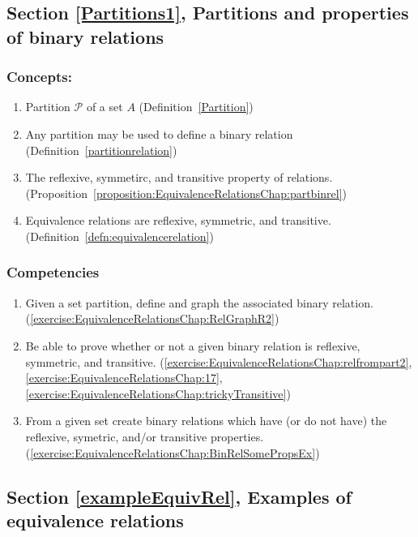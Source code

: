 \subsection*{Section \ref{Partitions1}, Partitions and properties of binary relations}
\subsubsection*{Concepts:}
\begin{enumerate}
\item 
Partition $\mathcal{P}$ of a set $A$ (Definition~\ref{Partition})
\item 
Any partition may be used to define a binary relation (Definition~\ref{partitionrelation})
\item 
The reflexive, symmetirc, and transitive property of relations. (Proposition~\ref{proposition:EquivalenceRelationsChap:partbinrel})
\item 
Equivalence relations are reflexive, symmetric, and transitive. (Definition~\ref{defn:equivalencerelation})
\end{enumerate}

\subsubsection*{Competencies}
\begin{enumerate}
\item
Given a set partition, define and graph the associated binary relation. (\ref{exercise:EquivalenceRelationsChap:RelGraphR2})
\item
Be able to prove whether or not a given binary relation is reflexive, symmetric, and transitive. (\ref{exercise:EquivalenceRelationsChap:relfrompart2}, \ref{exercise:EquivalenceRelationsChap:17}, \ref{exercise:EquivalenceRelationsChap:trickyTransitive})
\item
From a given set create binary relations which have (or do not have) the reflexive, symetric, and/or transitive properties. (\ref{exercise:EquivalenceRelationsChap:BinRelSomePropsEx})
\end{enumerate}


\subsection*{Section \ref{exampleEquivRel}, Examples of equivalence relations}
